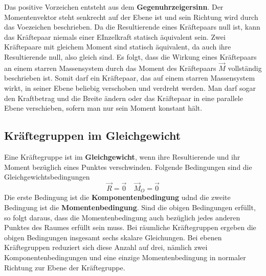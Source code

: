 Das positive Vorzeichen entsteht aus dem \textbf{Gegenuhrzeigersinn}. Der Momentenvektor steht senkrecht auf der Ebene ist und sein Richtung wird durch das Voezeichen beschrieben. Da die Resultierende eines Kräftepaars null ist, kann das Kräftepaar niemals einer EInzelkraft statisch äquivalent sein.
\newline\newline
Zwei Kräftepaare mit gleichem Moment sind statisch äquivalent, da auch ihre Resultierende null, also gleich sind. Es folgt, dass die Wirkung eines Kräftepaars an einem starren Massensystem durch das Moment des Kräftepaars $\overrightarrow{M}$ vollständig beschrieben ist. Somit darf ein Kräftepaar, das auf einem starren Massensystem wirkt, in seiner Ebene beliebig verschoben und verdreht werden.
\newline\newline
Man darf sogar den Kraftbetrag und die Breite ändern oder das Kräftepaar in eine parallele Ebene  verschieben, sofern man nur sein Moment konstant hält.
\subsection{Kräftegruppen im Gleichgewicht}
Eine Kräftegruppe ist im \textbf{Gleichgewicht}, wenn ihre Resultierende und ihr Moment bezüglich eines Punktes verschwinden. Folgende Bedingungen sind die Gleichgewichtsbedingungen
\begin{equation} 
\boxed{\overrightarrow{R}=\overrightarrow{0}}\quad \boxed{\overrightarrow{M}_O=\overrightarrow{0}} 
\end{equation}
Die erste Bedingung ist die \textbf{Komponentenbedingung} udnd die zweite Bedingung ist die \textbf{Momentenbedingung}. Sind die obigen Bedingungen erfüllt, so folgt daraus, dass die Momentenbedingung auch bezüglich jedes anderen Punktes des Raumes erfüllt sein muss.
\newline\newline
Bei räumliche Kräftegruppen ergeben die obigen Bedingungen insgesamt sechs skalare Gleichungen. Bei ebenen Kräftegruppen reduziert sich diese Anzahl auf drei, nämlich zwei Komponentenbedingungen und eine einzige Momentenbedingung in normaler Richtung zur Ebene der Kräftegruppe.
